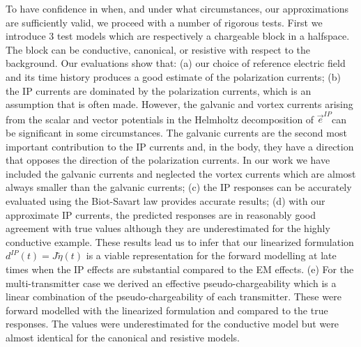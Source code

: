 \documentclass[extra,mreferee]{gji}
\newcommand {\e}  { {\vec e} }
\newcommand{\peta}{\tilde{\eta}}
\begin{document}
To have confidence in when, and under what circumstances, our approximations are sufficiently valid, we proceed with a number of rigorous tests. First we introduce 3 test models which are respectively a chargeable block in a halfspace. The block can be conductive, canonical, or resistive with respect to the background. Our evaluations show that:
(a) our choice of reference electric field and its time history produces a good estimate of the polarization currents;
(b) the IP currents are dominated by the polarization currents, which is an assumption that is often made. However, the galvanic and vortex currents arising from the scalar and vector potentials in the Helmholtz decomposition of $\e^{IP}$can be significant in some circumstances. The galvanic currents are the second most important contribution to the IP currents and, in the body, they have a direction that opposes the direction of the polarization currents. In our work we have included the galvanic currents and neglected the vortex currents which are almost always smaller than the galvanic currents;
(c) the IP responses can be accurately evaluated using the Biot-Savart law provides accurate results;
(d) with our approximate IP currents, the predicted responses are in reasonably good agreement with true values although they are underestimated for the highly conductive example. These results lead us to infer that our linearized formulation $d^{IP}(t)=J\peta(t)$ is a viable representation for the forward modelling at late times when  the IP effects are substantial compared to the EM effects.
(e) For the multi-transmitter case we derived an effective pseudo-chargeability which is a linear combination of the pseudo-chargeability of each transmitter. These were forward modelled with the linearized formulation and compared to the true responses. The values were underestimated for the conductive model but were almost identical for the canonical and resistive models.
\end{document}
